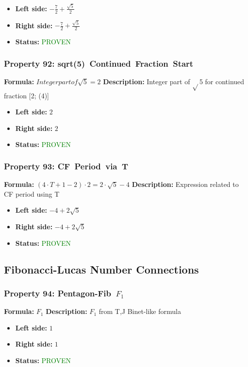 \begin{itemize}
\item \textbf{Left side:} $- \frac{7}{2} + \frac{\sqrt{5}}{2}$
\item \textbf{Right side:} $- \frac{7}{2} + \frac{\sqrt{5}}{2}$
\item \textbf{Status:} \textcolor{green}{PROVEN}
\end{itemize}

\subsubsection*{Property 92: sqrt(5)~Continued~Fraction~Start}
\textbf{Formula:} $Integer part of \sqrt{5} = 2$
\textbf{Description:} Integer part of $\sqrt{}$5 for continued fraction [2; (4)]

\begin{itemize}
\item \textbf{Left side:} $2$
\item \textbf{Right side:} $2$
\item \textbf{Status:} \textcolor{green}{PROVEN}
\end{itemize}

\subsubsection*{Property 93: CF~Period~via~T}
\textbf{Formula:} $(4 \cdot T+1-2) \cdot 2 = 2 \cdot \sqrt{5}-4$
\textbf{Description:} Expression related to CF period using T

\begin{itemize}
\item \textbf{Left side:} $-4 + 2 \sqrt{5}$
\item \textbf{Right side:} $-4 + 2 \sqrt{5}$
\item \textbf{Status:} \textcolor{green}{PROVEN}
\end{itemize}


\subsection{Fibonacci-Lucas Number Connections}

\subsubsection*{Property 94: Pentagon-Fib~$F_{1}$}
\textbf{Formula:} $F_1$
\textbf{Description:} $F_{1}$ from T,J Binet-like formula

\begin{itemize}
\item \textbf{Left side:} $1$
\item \textbf{Right side:} $1$
\item \textbf{Status:} \textcolor{green}{PROVEN}
\end{itemize}

